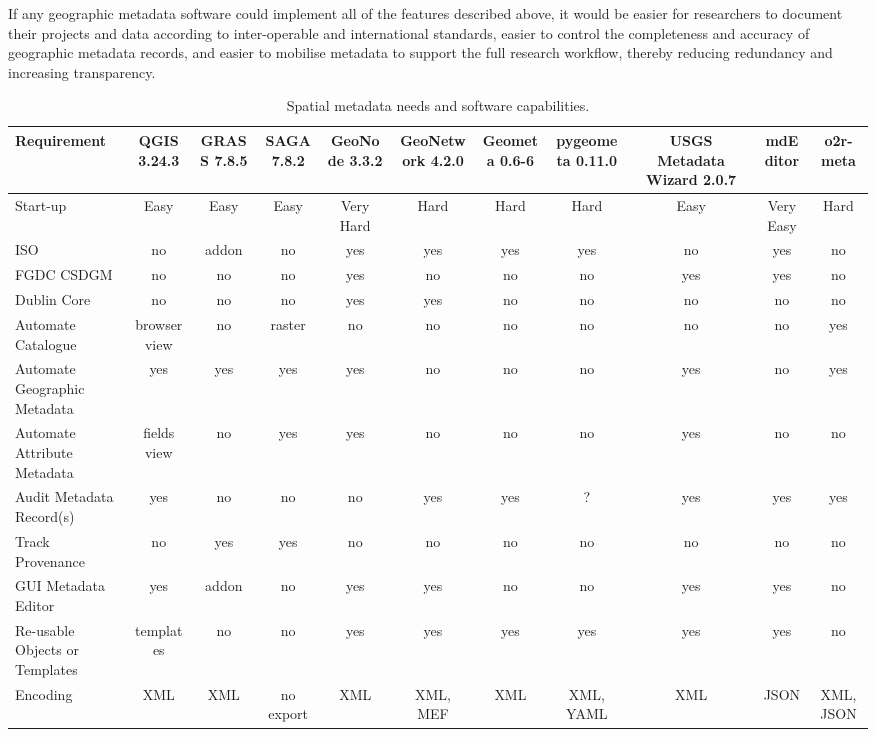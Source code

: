 \documentclass{isprs} %
\begin{document}
If any geographic metadata software could implement all of the features described above, it would be easier for researchers to document their projects and data according to inter-operable and international standards, easier to control the completeness and accuracy of geographic metadata records, and easier to mobilise metadata to support the full research workflow, thereby reducing redundancy and increasing transparency.

\begin{table*}[!ht]
    \centering
    \begin{tabular}{|p{3cm}|c|c|c|c|c|c|c|c|c|c|}
    \hline
        Requirement & QGIS 3.24.3 & GRASS 7.8.5 & SAGA 7.8.2 & GeoNode 3.3.2 & GeoNetwork 4.2.0 &  Geometa 0.6-6 & pygeometa 0.11.0 & USGS Metadata Wizard 2.0.7 & mdEditor & o2r-meta \\ \hline
        Start-up & Easy & Easy & Easy & Very Hard & Hard & Hard & Hard & Easy & Very Easy & Hard \\ 
        ISO & no & addon & no & yes & yes & yes & yes & no & yes & no \\ 
        FGDC CSDGM & no & no & no & yes & no & no & no & yes & yes & no \\ 
        Dublin Core & no & no & no & yes & yes & no & no & no & no & no \\ 
        Automate Catalogue & browser view & no & raster & no & no & no & no & no & no & yes \\ 
        Automate Geographic Metadata & yes & yes & yes & yes & no & no & no & yes & no & yes \\ 
        Automate Attribute Metadata & fields view & no & yes & yes & no & no & no & yes & no & no \\ 
        Audit Metadata Record(s) & yes & no & no & no & yes & yes & ? & yes & yes & yes \\ 
        Track Provenance & no & yes & yes & no & no & no & no & no & no & no \\ 
        GUI Metadata Editor & yes & addon & no & yes & yes & no & no & yes & yes & no \\ 
        Re-usable Objects or Templates & templates & no & no & yes & yes & yes & yes & yes & yes & no \\ 
        Encoding & XML & XML & no export & XML & XML, MEF & XML & XML, YAML & XML & JSON & XML, JSON \\ \hline
    \end{tabular}
\caption{Spatial metadata needs and software capabilities.}
\label{tab:Metadata_Software}
\end{table*}
\end{document}
